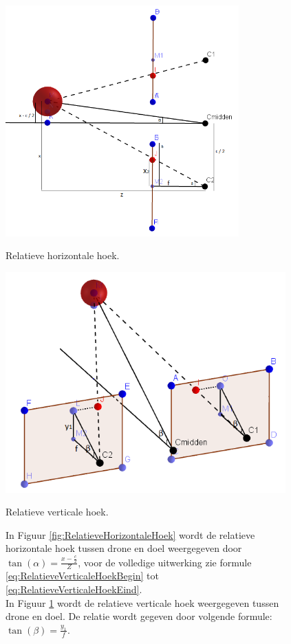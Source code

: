 \begin{figure}[h]
	\centering
	\begin{minipage}{.45\textwidth}
		\centering
		\includegraphics[width=0.8\textwidth]{RelatieveHorizontaleHoek.png}
		\caption{Relatieve horizontale hoek.}
		\label{fig:RelatieveHorizontaleHoek}
	\end{minipage}
	\begin{minipage}{.45\textwidth}
		\centering
		\includegraphics[width=0.96\textwidth]{RelatieveVerticaleHoek.png}
		\caption{Relatieve verticale hoek.}
		\label{fig:RelatieveVerticaleHoek}
	\end{minipage}%
	\caption*{In Figuur \ref{fig:RelatieveHorizontaleHoek} wordt de relatieve horizontale hoek tussen drone en doel weergegeven door \(\tan(\alpha) = \frac{x-\frac{c}{2}}{Z}\), voor de volledige uitwerking zie formule \ref{eq:RelatieveVerticaleHoekBegin} tot \ref{eq:RelatieveVerticaleHoekEind}.\\
		In Figuur \ref{fig:RelatieveVerticaleHoek} wordt de relatieve verticale hoek weergegeven tussen drone en doel. De relatie wordt gegeven door volgende formule: \(\tan(\beta) = \frac{y_1}{f}\).}
\end{figure}
